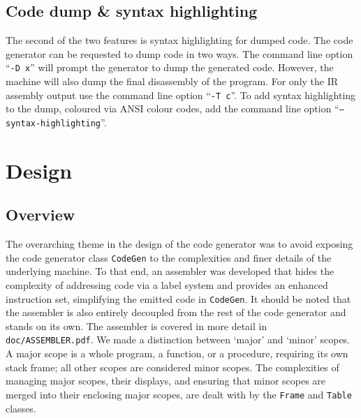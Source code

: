 \documentclass[oneside]{amsart}
\theoremstyle{definition}
\theoremstyle{remark}
\numberwithin{equation}{section}
\begin{document}
\subsection{Code dump \& syntax highlighting}
The second of the two features is syntax highlighting for dumped code. The code generator can be
requested to dump code in two ways. The command line option ``\texttt{-D x}'' will prompt the
generator to dump the generated code. However, the machine will also dump the final disassembly of
the program. For only the IR assembly output use the command line option ``\texttt{-T c}''. To add
syntax highlighting to the dump, coloured via ANSI colour codes, add the command line option
``\texttt{--syntax-highlighting}''.

\section{Design}
\subsection{Overview}
The overarching theme in the design of the code generator was to avoid exposing the code generator
class \texttt{CodeGen} to the complexities and finer details of the underlying machine. To that end,
an assembler was developed that hides the complexity of addressing code via a label system and
provides an enhanced instruction set, simplifying the emitted code in \texttt{CodeGen}. It should be
noted that the assembler is also entirely decoupled from the rest of the code generator and stands
on its own. The assembler is covered in more detail in \texttt{doc/ASSEMBLER.pdf}. We made a
distinction  between `major' and `minor' scopes. A major scope is a whole program, a function, or a
procedure, requiring its own stack frame; all other scopes are considered minor scopes. The
complexities of  managing major scopes, their displays, and ensuring that minor scopes are merged
into their enclosing  major scopes, are dealt with by the \texttt{Frame} and \texttt{Table} classes.
\end{document}

